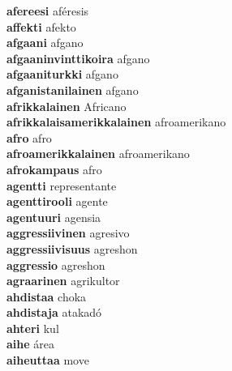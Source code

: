 \textbf{afereesi } aféresis \\
\textbf{affekti } afekto \\
\textbf{afgaani } afgano \\
\textbf{afgaaninvinttikoira } afgano \\
\textbf{afgaaniturkki } afgano \\
\textbf{afganistanilainen } afgano \\
\textbf{afrikkalainen } Africano \\
\textbf{afrikkalaisamerikkalainen } afroamerikano \\
\textbf{afro } afro \\
\textbf{afroamerikkalainen } afroamerikano \\
\textbf{afrokampaus } afro \\
\textbf{agentti } representante \\
\textbf{agenttirooli } agente \\
\textbf{agentuuri } agensia \\
\textbf{aggressiivinen } agresivo \\
\textbf{aggressiivisuus } agreshon \\
\textbf{aggressio } agreshon \\
\textbf{agraarinen } agrikultor \\
\textbf{ahdistaa } choka \\
\textbf{ahdistaja } atakadó \\
\textbf{ahteri } kul \\
\textbf{aihe } área \\
\textbf{aiheuttaa } move \\
